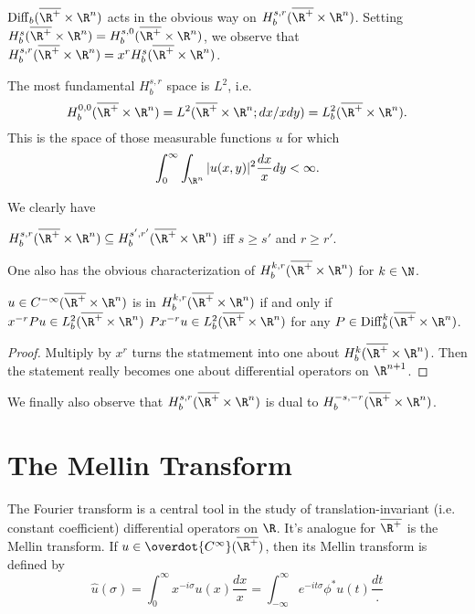 \documentclass[12pt]{article}
\DeclareMathOperator{\Diff}{Diff}
\begin{document}
$\Diff_b(\mo)$ acts in the obvious way on $H^{s,r}_b(\mo)$. Setting $H^s_b(\mo) = H^{s,0}_b(\mo)$, we observe that $H^{s,r}_b(\mo) = x^rH^s_b(\mo)$.

The most fundamental $H^{s,r}_b$ space is $L^2$, i.e.
\[H^{0,0}_b(\mo) = L^2(\mo;dx/xdy) = L^2_b(\mo).\]
This is the space of those measurable functions $u$ for which
\[\int_0^\infty \int_{\R^n} |u(x,y)|^2\frac{dx}{x}dy < \infty.\] 

We clearly have
\begin{lem}$H^{s,r}_b(\mo) \subseteq H^{s',r'}_b(\mo)$ iff $s \geq s'$ and $r \geq r'$.\end{lem}

One also has the obvious characterization of $H^{k,r}_b(\mo)$ for $k \in \N$.
\begin{prop}$u \in C^{-\infty}(\mo)$ is in $H^{k,r}_b(\mo)$ if and only if $x^{-r}Pu \in L^2_b(\mo)$ $Px^{-r}u \in L^2_b(\mo)$ for any $P \in \Diff_b^k(\mo)$.\end{prop}
\begin{proof}
Multiply by $x^r$ turns the statmement into one about $H^k_b(\mo)$. Then the statement really becomes one about differential operators on $\R^{n+1}$.\end{proof}

We finally also observe that $H^{s,r}_b(\mo)$ is dual to $H^{-s,-r}_b(\mo)$.


\section{The Mellin Transform}
The Fourier transform is a central tool in the study of translation-invariant (i.e. constant coefficient) differential operators on $\R$. It's analogue for $\overline{\R^+}$ is the Mellin transform. If $u \in \overdot{C^\infty}(\overline{\R^+})$, then its Mellin transform is defined by
\[\hat{u}(\sigma) = \int_0^\infty x^{-i\sigma}u(x)\frac{dx}{x} = \int_{-\infty}^\infty e^{-it\sigma}\phi^{\ast}u(t)\frac{dt}.\]
\end{document}
